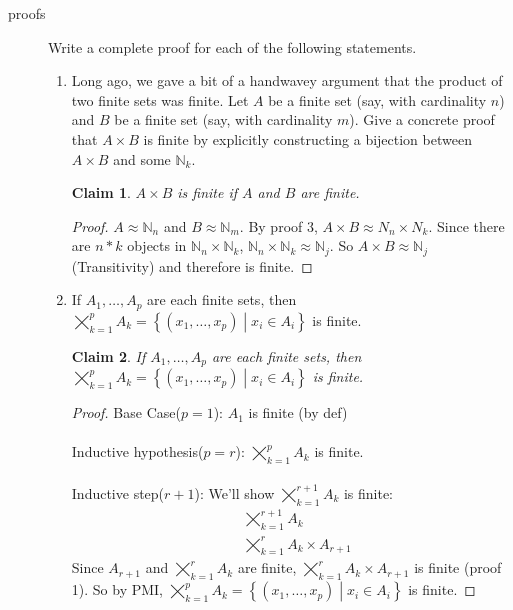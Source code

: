 \documentclass[11pt]{letter}
\newtheorem{claim}{Claim}
\theoremstyle{definition}
\begin{document}
\begin{description}
\item[proofs] Write a complete proof for each of the following statements.
	\begin{enumerate}
        \item Long ago, we gave a bit of a handwavey argument that the product of two finite sets was finite. Let $A$ be a finite set (say, with cardinality $n$) and $B$ be a finite set (say, with cardinality $m$). Give a concrete proof that $A\times B$ is finite by explicitly constructing a bijection between $A\times B$ and some $\mathbb{N}_{k}$.
          \begin{claim}
            $A\times B$ is finite if $A$ and $B$ are finite.
          \end{claim}
          \begin{proof}
            $A\approx \mathbb{N}_n$ and $B\approx \mathbb{N}_m$.  By proof 3, $A\times B\approx N_n\times N_k$. Since there are $n*k$ objects in $\mathbb{N}_n\times \mathbb{N}_k$, $\mathbb{N}_n\times \mathbb{N}_k\approx \mathbb{N}_j$. So $A\times B\approx \mathbb{N}_j$ (Transitivity) and therefore is finite.
          \end{proof}
          
          
		
        \item If $A_1,\ldots, A_p$ are each finite sets, then $\displaystyle\bigtimes_{k=1}^p A_k=\left\{(x_1,\ldots,x_p)\middle\vert x_i\in A_i\right\}$ is finite.
          \begin{claim}
            If $A_1,\ldots, A_p$ are each finite sets, then $\displaystyle\bigtimes_{k=1}^p A_k=\left\{(x_1,\ldots,x_p)\middle\vert x_i\in A_i\right\}$ is finite.
          \end{claim}
          \begin{proof}
            Base Case($p=1$): $A_1$ is finite (by def)\\ \\
            Inductive hypothesis($p=r$): $\displaystyle\bigtimes_{k=1}^p A_k$ is finite.\\ \\
            Inductive step($r+1$): We'll show $\displaystyle\bigtimes_{k=1}^{r+1} A_k$ is finite:\\
            \begin{align*}
              & \displaystyle\bigtimes_{k=1}^{r+1} A_k \\
              & \displaystyle\bigtimes_{k=1}^r A_k\times A_{r+1}
            \end{align*}
            Since $A_{r+1}$ and $\displaystyle\bigtimes_{k=1}^r A_k$ are finite, $\displaystyle\bigtimes_{k=1}^r A_k\times A_{r+1}$ is finite (proof 1). So by PMI, $\displaystyle\bigtimes_{k=1}^p A_k=\left\{(x_1,\ldots,x_p)\middle\vert x_i\in A_i\right\}$ is finite. 
          \end{proof}
          

\end{enumerate}
\end{description}
\end{document}
